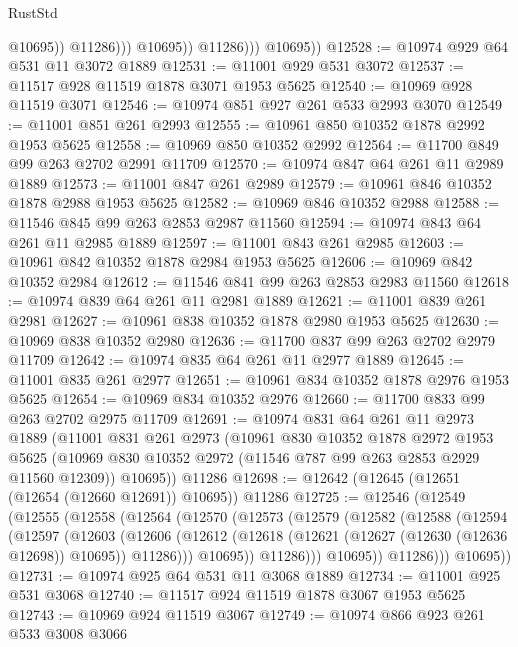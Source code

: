 \begin{lexlean}{RustStd}
\begin{coremodule}
                            @10695))
                        @11286)))
                  @10695))
              @11286)))
        @10695))
@12528 := @10974 @929 @64 @531 @11 @3072 @1889
@12531 := @11001 @929 @531 @3072
@12537 := @11517 @928 @11519 @1878 @3071 @1953 @5625
@12540 := @10969 @928 @11519 @3071
@12546 := @10974 @851 @927 @261 @533 @2993 @3070
@12549 := @11001 @851 @261 @2993
@12555 := @10961 @850 @10352 @1878 @2992 @1953 @5625
@12558 := @10969 @850 @10352 @2992
@12564 := @11700 @849 @99 @263 @2702 @2991 @11709
@12570 := @10974 @847 @64 @261 @11 @2989 @1889
@12573 := @11001 @847 @261 @2989
@12579 := @10961 @846 @10352 @1878 @2988 @1953 @5625
@12582 := @10969 @846 @10352 @2988
@12588 := @11546 @845 @99 @263 @2853 @2987 @11560
@12594 := @10974 @843 @64 @261 @11 @2985 @1889
@12597 := @11001 @843 @261 @2985
@12603 := @10961 @842 @10352 @1878 @2984 @1953 @5625
@12606 := @10969 @842 @10352 @2984
@12612 := @11546 @841 @99 @263 @2853 @2983 @11560
@12618 := @10974 @839 @64 @261 @11 @2981 @1889
@12621 := @11001 @839 @261 @2981
@12627 := @10961 @838 @10352 @1878 @2980 @1953 @5625
@12630 := @10969 @838 @10352 @2980
@12636 := @11700 @837 @99 @263 @2702 @2979 @11709
@12642 := @10974 @835 @64 @261 @11 @2977 @1889
@12645 := @11001 @835 @261 @2977
@12651 := @10961 @834 @10352 @1878 @2976 @1953 @5625
@12654 := @10969 @834 @10352 @2976
@12660 := @11700 @833 @99 @263 @2702 @2975 @11709
@12691 := @10974
    @831
    @64
    @261
    @11
    @2973
    @1889
    (@11001
      @831
      @261
      @2973
      (@10961
        @830
        @10352
        @1878
        @2972
        @1953
        @5625
        (@10969 @830 @10352 @2972 (@11546 @787 @99 @263 @2853 @2929 @11560 @12309))
        @10695))
    @11286
@12698 := @12642 (@12645 (@12651 (@12654 (@12660 @12691)) @10695)) @11286
@12725 := @12546
    (@12549
      (@12555
        (@12558
          (@12564
            (@12570
              (@12573
                (@12579
                  (@12582
                    (@12588
                      (@12594
                        (@12597
                          (@12603
                            (@12606
                              (@12612
                                (@12618 (@12621 (@12627 (@12630 (@12636 @12698)) @10695)) @11286)))
                            @10695))
                        @11286)))
                  @10695))
              @11286)))
        @10695))
@12731 := @10974 @925 @64 @531 @11 @3068 @1889
@12734 := @11001 @925 @531 @3068
@12740 := @11517 @924 @11519 @1878 @3067 @1953 @5625
@12743 := @10969 @924 @11519 @3067
@12749 := @10974 @866 @923 @261 @533 @3008 @3066

\end{coremodule}
\end{lexlean}
